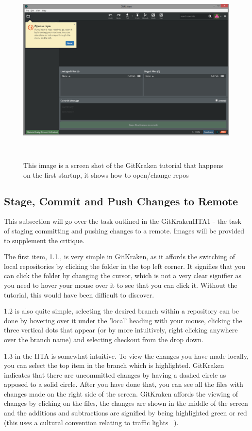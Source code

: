 \documentclass{sigchi}
\begin{document}
\begin{figure}
  \centering
  \includegraphics[width=1.75\columnwidth]{figures/GitKraken/Open_a_repo}
  \caption{This image is a screen shot of the GitKraken tutorial that happens on the first startup, it shows how to open/change repos}~\label{fig:GitKrakenFigure1}
\end{figure}

\subsection{Stage, Commit and Push Changes to Remote}
This subsection will go over the task outlined in the GitKrakenHTA1 - the task of staging committing 
and pushing changes to a remote. Images will be provided to supplement the critique. 

The first item, 1.1., is very simple in GitKraken, as it affords the switching of local repositories by clicking the folder
 in the top left corner. It signifies that you can click the folder by changing the cursor, which is not a very clear signifier 
as you need to hover your mouse over it to see that you can click it. Without the tutorial, this would have been difficult to discover.

1.2 is also quite simple, selecting the desired branch within a repository can be done by hovering over it under the 
'local' heading with your mouse, clicking the three vertical dots that appear (or by more intuitively, right clicking anywhere over the branch name) 
and selecting checkout from the drop down.

1.3 in the HTA is somewhat intuitive. To view the changes you have made locally, you can select the top item in
the branch which is highlighted. GitKraken indicates that there are uncommitted changes by having a dashed circle as apposed to a solid circle.
After you have done that, you can see all the files with changes made on the right side of the screen.
GitKraken affords the viewing of changes by clicking on the files, the changes are shown in the middle of the screen and the additions and subtractions are signified by being highlighted green or red (this uses a cultural convention relating to traffic lights ~\cite{Norman:2013}). 
\end{document}
